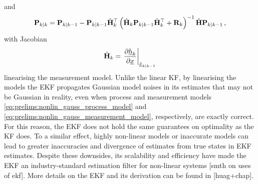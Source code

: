 and
\begin{equation}\label{eq:prelims:ekf_cov_update}
    {\ensuremath{{\mathbf{P}}}}_{k|k} = {{\mathbf{P}}}_{k|k-1}-{{\mathbf{P}}}_{k|k-1}\hat{{{\mathbf{H}}}}_k^\top\left(\hat{{{\mathbf{H}}}}_k{{\mathbf{P}}}_{k|k-1}\hat{{{\mathbf{H}}}}_k^\top + {{\mathbf{R}}}_k\right)^{-1}\hat{{{\mathbf{H}}}}{{\mathbf{P}}}_{k|k-1}\,,
\end{equation}
with Jacobian
\begin{equation}\label{eq:prelims:ekf_update_jacobian}
    \hat{{{\mathbf{H}}}}_k = \left.\frac{\partial {\underline{h}}_k}{\partial {\underline{x}}}\right|_{\hat{{\underline{x}}}_{k|k-1}}
\end{equation}
linearising the measurement model. Unlike the linear KF, by linearising the models the EKF propagates Gaussian model noises in its estimates that may not be Gaussian in reality, even when process and measurement models \eqref{eq:prelims:nonlin_gauss_process_model} and \eqref{eq:prelims:nonlin_gauss_measurement_model}, respectively, are exactly correct. For this reason, the EKF does not hold the same guarantees on optimality as the KF does. To a similar effect, highly non-linear models or inaccurate models can lead to greater inaccuracies and divergence of estimates from true states in EKF estimates. Despite these downsides, its scalability and efficiency have made the EKF an industry-standard estimation filter for non-linear systems [smth on uses of ekf]. More details on the EKF and its derivation can be found in [huag+chap].

% 
% 

